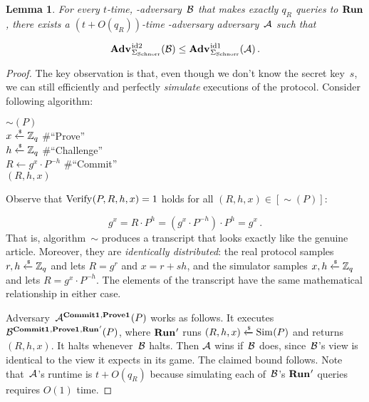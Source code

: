 \documentclass{article}
\newtheorem{lemma}{Lemma}
\theoremstyle{remark}
\begin{document}
\begin{lemma}\label{lemma:id1->id2}
  For every $t$-time, -adversary~$\mathcal{B}$ that makes exactly $q_R$ queries to
  $\textup{\textbf{Run}}\hspace{0.5pt}$, there exists a $(t + O(q_R))$-time -adversary adversary~$\mathcal{A}$ such
  that

  \begin{equation}
    \Adv{\id2}_\Schnorr(\B) \leq \Adv{\id1}_\Schnorr(\A)
    \,.
  \end{equation}
\end{lemma}
\begin{proof}
  The key observation is that, even though we don't know the secret key~$s$, we
  can still efficiently and perfectly \emph{simulate} executions of the protocol. Consider
  following algorithm:

  {\ga
    \fu $\sim(P)$\\[2pt]
      \li $x \xleftarrow{\text{\tiny{\$}}} \mathbb{Z}_q$ \#{``Prove''}\\
      \li $h \xleftarrow{\text{\tiny{\$}}} \mathbb{Z}_q$ \#{``Challenge''}\\
      \li $R \gets g^x \cdot P^{-h}$ \#{``Commit''}\\
      \li \rreturn $(R, h, x)$
  }

  \noindent
  Observe that $\textnormal{Verify}\hspace{0.33pt}(P,R,h,x)=1$ holds for all $(R,h,x)\in[\sim(P)]$:

  \begin{equation}
    g^x = R \cdot P^{h} = (g^x \cdot P^{-h}) \cdot P^h = g^x \,.
  \end{equation}
  That is, algorithm~$\sim$ produces a transcript that looks exactly like the
  genuine article. Moreover, they are \emph{identically distributed}: the real
  protocol samples $r, h \xleftarrow{\text{\tiny{\$}}} \mathbb{Z}_q$ and lets $R = g^r$ and $x = r + sh$, and
  the simulator samples $x, h \xleftarrow{\text{\tiny{\$}}} \mathbb{Z}_q$ and lets $R = g^x \cdot P^{-h}$. The
  elements of the transcript have the same mathematical relationship in either
  case.

  Adversary~$\mathcal{A}^{\textup{\textbf{Commit1}}\hspace{0.5pt},\textup{\textbf{Prove1}}\hspace{0.5pt}}(P)$ works as follows.
  It executes $\mathcal{B}^{\textup{\textbf{Commit1}}\hspace{0.5pt},\textup{\textbf{Prove1}}\hspace{0.5pt},\textup{\textbf{Run}}\hspace{0.5pt}'}(P)$, where $\textup{\textbf{Run}}\hspace{0.5pt}'$ runs $(R, h,
  x)\xleftarrow{\text{\tiny{\$}}}\textnormal{Sim}\hspace{0.33pt}(P)$ and returns $(R, h, x)$. It halts whenever~$\mathcal{B}$ halts.
  Then $\mathcal{A}$ wins if~$\mathcal{B}$ does, since~$\mathcal{B}$'s view is identical to the view it
  expects in its game. The claimed bound follows. Note that~$\mathcal{A}$'s runtime is
  $t+O(q_R)$ because simulating each of~$\mathcal{B}$'s $\textup{\textbf{Run}}\hspace{0.5pt}'$ queries requires $O(1)$
  time.
\end{proof}
\end{document}
